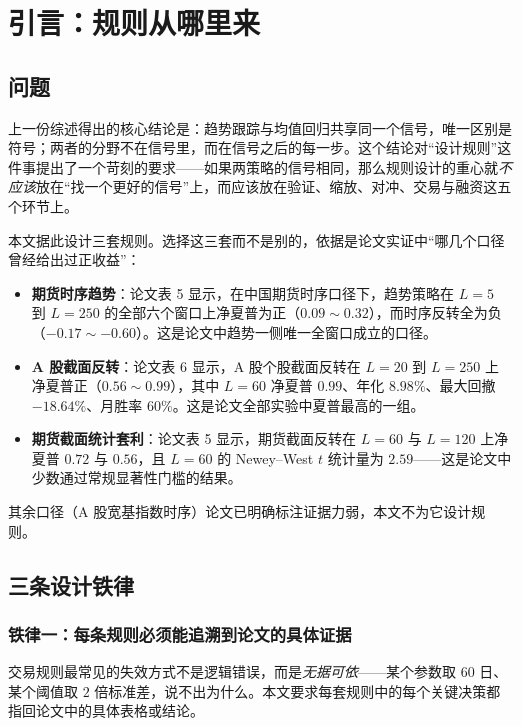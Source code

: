 \section{引言：规则从哪里来}\label{sec:intro}

\subsection{问题}

上一份综述得出的核心结论是：趋势跟踪与均值回归共享同一个信号，唯一区别是符号；两者的分野不在信号里，而在信号之后的每一步。这个结论对“设计规则”这件事提出了一个苛刻的要求——如果两策略的信号相同，那么规则设计的重心就\emph{不应该}放在“找一个更好的信号”上，而应该放在验证、缩放、对冲、交易与融资这五个环节上。

本文据此设计三套规则。选择这三套而不是别的，依据是论文实证中“哪几个口径曾经给出过正收益”：

\begin{itemize}[leftmargin=2.2em]
  \item \textbf{期货时序趋势}：论文表 5 显示，在中国期货时序口径下，趋势策略在 $L=5$ 到 $L=250$ 的全部六个窗口上净夏普为正（$0.09\sim0.32$），而时序反转全为负（$-0.17\sim-0.60$）。这是论文中趋势一侧唯一全窗口成立的口径。
  \item \textbf{A 股截面反转}：论文表 6 显示，A 股个股截面反转在 $L=20$ 到 $L=250$ 上净夏普正（$0.56\sim0.99$），其中 $L=60$ 净夏普 $0.99$、年化 $8.98\%$、最大回撤 $-18.64\%$、月胜率 $60\%$。这是论文全部实验中夏普最高的一组。
  \item \textbf{期货截面统计套利}：论文表 5 显示，期货截面反转在 $L=60$ 与 $L=120$ 上净夏普 $0.72$ 与 $0.56$，且 $L=60$ 的 Newey--West $t$ 统计量为 $2.59$——这是论文中少数通过常规显著性门槛的结果。
\end{itemize}

其余口径（A 股宽基指数时序）论文已明确标注证据力弱，本文不为它设计规则。

\subsection{三条设计铁律}

\subsubsection*{铁律一：每条规则必须能追溯到论文的具体证据}

交易规则最常见的失效方式不是逻辑错误，而是\emph{无据可依}——某个参数取 $60$ 日、某个阈值取 $2$ 倍标准差，说不出为什么。本文要求每套规则中的每个关键决策都指回论文中的具体表格或结论。

